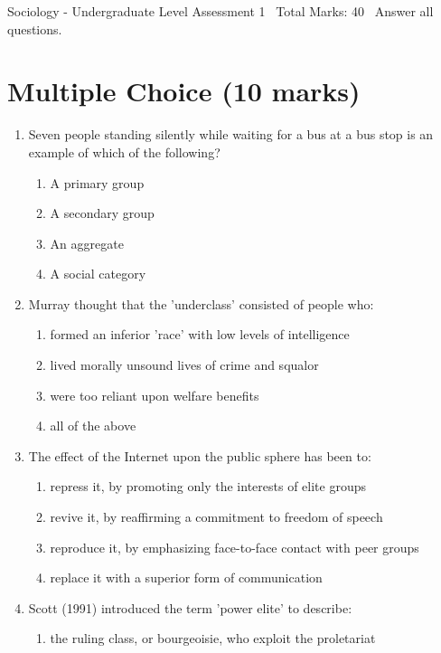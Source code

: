 \documentclass[12pt]{article}
\begin{document}
\begin{center}
Sociology - Undergraduate Level Assessment 1 \
Total Marks: 40 \
Answer all questions.
\end{center}

\section*{Multiple Choice (10 marks)}
\begin{enumerate}[label=\arabic*.]
\item Seven people standing silently while waiting for a bus at a bus stop is an example of which of the following?
\begin{enumerate}[label=(\alph*)]
    \item A primary group
    \item A secondary group
    \item An aggregate
    \item A social category
\end{enumerate}
\item Murray thought that the 'underclass' consisted of people who:
\begin{enumerate}[label=(\alph*)]
    \item formed an inferior 'race' with low levels of intelligence
    \item lived morally unsound lives of crime and squalor
    \item were too reliant upon welfare benefits
    \item all of the above
\end{enumerate}
\item The effect of the Internet upon the public sphere has been to:
\begin{enumerate}[label=(\alph*)]
    \item repress it, by promoting only the interests of elite groups
    \item revive it, by reaffirming a commitment to freedom of speech
    \item reproduce it, by emphasizing face-to-face contact with peer groups
    \item replace it with a superior form of communication
\end{enumerate}
\item Scott (1991) introduced the term 'power elite' to describe:
\begin{enumerate}[label=(\alph*)]
    \item the ruling class, or bourgeoisie, who exploit the proletariat

\end{enumerate}
\end{enumerate}
\end{document}
